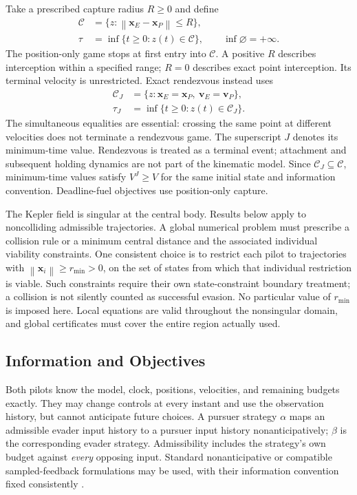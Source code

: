 \documentclass[journal,a4paper]{IEEEtran}
\newcommand{\C}{\mathcal C}
\newcommand{\norm}[1]{\left\|#1\right\|}
\begin{document}
Take a prescribed capture radius $R\ge0$ and define
\begin{align}
 \C&=\{z:\norm{\mathbf x_E-\mathbf x_P}\le R\},\label{eq:target}\\
 \tau&=\inf\{t\ge0:z(t)\in\C\},\qquad \inf\varnothing=+\infty.
 \label{eq:tau}
\end{align}
The position-only game stops at first entry into $\C$. A positive $R$ describes interception within a specified range; $R=0$ describes exact point interception. Its terminal velocity is unrestricted. Exact rendezvous instead uses
\begin{align}
 \C_J&=\{z:\mathbf x_E=\mathbf x_P,\ \mathbf v_E=\mathbf v_P\},\label{eq:boardingtarget}\\
 \tau_J&=\inf\{t\ge0:z(t)\in\C_J\}.\label{eq:tauJ}
\end{align}
The simultaneous equalities are essential: crossing the same point at different velocities does not terminate a rendezvous game. The superscript $J$ denotes its minimum-time value. Rendezvous is treated as a terminal event; attachment and subsequent holding dynamics are not part of the kinematic model. Since $\C_J\subseteq\C$, minimum-time values satisfy $V^J\ge V$ for the same initial state and information convention. Deadline-fuel objectives use position-only capture.

The Kepler field is singular at the central body. Results below apply to noncolliding admissible trajectories. A global numerical problem must prescribe a collision rule or a minimum central distance and the associated individual viability constraints. One consistent choice is to restrict each pilot to trajectories with $\norm{\mathbf x_i}\ge r_{\min}>0$, on the set of states from which that individual restriction is viable. Such constraints require their own state-constraint boundary treatment; a collision is not silently counted as successful evasion. No particular value of $r_{\min}$ is imposed here. Local equations are valid throughout the nonsingular domain, and global certificates must cover the entire region actually used.

\subsection{Information and Objectives}
Both pilots know the model, clock, positions, velocities, and remaining budgets exactly. They may change controls at every instant and use the observation history, but cannot anticipate future choices. A pursuer strategy $\alpha$ maps an admissible evader input history to a pursuer input history nonanticipatively; $\beta$ is the corresponding evader strategy. Admissibility includes the strategy's own budget against \emph{every} opposing input. Standard nonanticipative or compatible sampled-feedback formulations may be used, with their information convention fixed consistently \cite{EvansSouganidis1984}.
\end{document}
